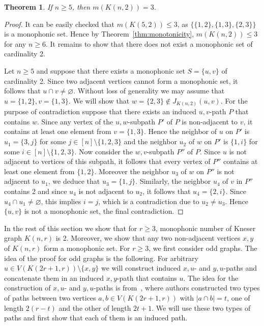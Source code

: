 \documentclass[a4paper,11pt]{article}
\newtheorem{theorem}{Theorem}
\renewcommand{\emptyset}{\varnothing}
\begin{document}
\begin{theorem}\label{thm:r=2}
    If $n\geq 5$, then $m(K(n,2))=3$.
\end{theorem}
\begin{proof}
    It can be easily checked that $m(K(5,2)) \leq 3$, as $\{\{1,2\},\{1,3\},\{2,3\}\}$ is a monophonic set. Hence by Theorem~\ref{thm:monotonicity}, $m(K(n,2)) \leq 3$ for any $n\geq 6$. It remains to show that there does not exist a monophonic set of cardinality 2.

    Let $n\geq 5$ and suppose that there exists a monophonic set $S=\{u,v\}$ of cardinality 2. Since two adjacent vertices cannot form a monophonic set, it follows that $u \cap v \neq \emptyset$. Without loss of generality we may assume that $u=\{1,2\},v=\{1,3\}$. We will show that $w=\{2,3\} \notin J_{K(n,2)}(u,v)$. For the purpose of contradiction suppose that there exists an induced $u,v$-path $P$ that contains $w$. Since any vertex of the $u,w$-subpath $P'$ of $P$ is non-adjacent to $v$, it contains at least one element from $v=\{1,3\}$. Hence the neighbor of $u$ on $P'$ is $u_1=\{3,j\}$ for some $j \in [n] \setminus \{1,2,3\}$ and the neighbor $u_2$ of $w$ on $P'$ is $\{1,i\}$ for some $i \in [n] \setminus \{1,2,3\}$. Now consider the $w,v$-subpath $P''$ of $P$. Since $u$ is not adjacent to vertices of this subpath, it follows that every vertex of $P''$ contains at least one element from $\{1,2\}$. Moreover the neighbor $u_3$ of $w$ on $P''$ is not adjacent to $u_1$, we deduce that $u_3=\{1,j\}$. Similarly, the neighbor $u_4$ of $v$ in $P''$ contains 2 and since $u_4$ is not adjacent to $u_2$, it follows that $u_4=\{2,i\}$. Since $u_4 \cap u_1\ne\emptyset$, this implies $i=j$, which is a contradiction due to $u_2\ne u_3$.  Hence $\{u,v\}$ is not a monophonic set, the final contradiction.  
\end{proof}




In the rest of this section we show that for $r \geq 3$, monophonic number of Kneser graph $K(n,r)$ is 2. Moreover, we show that any two non-adjacent vertices $x,y$ of $K(n,r)$ form a monophonic set. For $r \geq 3$, we first consider odd graphs. The idea of the proof for odd graphs is the following. For arbitrary $u\in V(K(2r+1,r)) \setminus \{x,y\}$ we will construct induced $x,u$- and $y,u$-paths and concatenate them in an induced $x,y$-path that contains $u$. The idea for the construction of $x,u$- and $y,u$-paths is from~\cite{valencia2005diameter}, where authors constructed two types of paths between two vertices $a,b \in V(K(2r+1,r))$ with $|a \cap b|=t$, one of length $2(r-t)$ and the other of length $2t+1.$ We will use these two types of paths and first show that each of them is an induced path.
\end{document}
